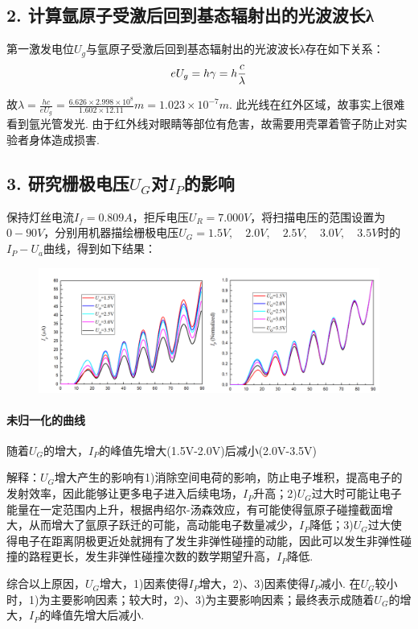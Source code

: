 \documentclass[UTF8]{ctexart}
\begin{document}
\subsection*{2. 计算氩原子受激后回到基态辐射出的光波波长λ}
第一激发电位$U_g$与氩原子受激后回到基态辐射出的光波波长λ存在如下关系：\vspace{-1em}
\[eU_g=h\gamma=h\frac{c}{\lambda}\vspace{-1em}\]

故$\displaystyle{\lambda=\frac{hc}{eU_g}}=\frac{6.626\times2.998\times 10^8}{1.602\times 12.11}m=1.023\times 10^{-7}m$.
此光线在红外区域，故事实上很难看到氩光管发光. 由于红外线对眼睛等部位有危害，故需要用壳罩着管子防止对实验者身体造成损害.



\subsection*{3. 研究栅极电压$U_G$对$I_P$的影响}

保持灯丝电流$I_f=0.809A$，拒斥电压$U_R=7.000V$，将扫描电压的范围设置为$0-90V$，分别用机器描绘栅极电压$U_G=1.5V,\quad 2.0V,\quad 2.5V,\quad 3.0V,\quad 3.5V$时的$I_P-U_a$曲线，得到如下结果：\vspace{-2em}
\begin{center}
    \begin{figure}[H]
        \includegraphics[scale=0.5]{2.png}\vspace{-3em}\\
    \end{figure}
\end{center}\vspace{-5em}
\paragraph{未归一化的曲线} 随着$U_G$的增大，$I_P$的峰值先增大(1.5V-2.0V)后减小(2.0V-3.5V)\par
解释：$U_G$增大产生的影响有1)消除空间电荷的影响，防止电子堆积，提高电子的发射效率，因此能够让更多电子进入后续电场，$I_P$升高；2)$U_G$过大时可能让电子能量在一定范围内上升，根据冉绍尔-汤森效应，有可能使得氩原子碰撞截面增大，从而增大了氩原子跃迁的可能，高动能电子数量减少，$I_P$降低；3)$U_G$过大使得电子在距离阴极更近处就拥有了发生非弹性碰撞的动能，因此可以发生非弹性碰撞的路程更长，发生非弹性碰撞次数的数学期望升高，$I_P$降低.\par
综合以上原因，$U_G$增大，1)因素使得$I_P$增大，2)、3)因素使得$I_P$减小. 在$U_G$较小时，1)为主要影响因素；较大时，2)、3)为主要影响因素；最终表示成随着$U_G$的增大，$I_P$的峰值先增大后减小.\vspace{-1em}
\end{document}
